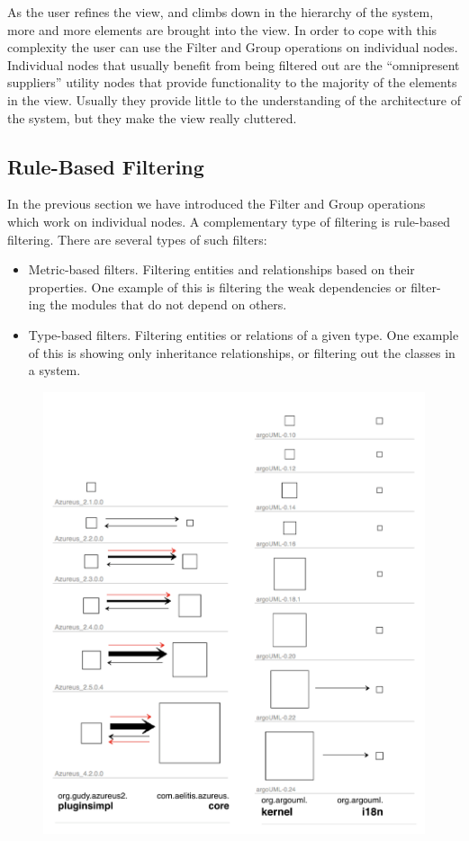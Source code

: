 \documentclass[preprint,12pt]{elsarticle}
\begin{document}
As the user refines the view, and climbs down in the hierarchy of the system, more and more elements are brought into the view. In order to cope with this complexity the user can use the Filter and Group operations on individual nodes. Individual nodes that usually benefit from being filtered out are the “omnipresent suppliers” utility nodes that provide functionality to the majority of the elements in the view. Usually they provide little to the understanding of the architecture of the system, but they make the view really cluttered. 



\subsection {Rule-Based Filtering}

In the previous section we have introduced the Filter and Group operations which work on individual nodes. A complementary type of filtering is rule-based filtering. There are several types of such filters:

\begin{itemize}
\item Metric-based filters. Filtering entities and relationships based on their properties. One example of this is filtering the weak dependencies or filter- ing the modules that do not depend on others.
\item Type-based filters. Filtering entities or relations of a given type. One example of this is showing only inheritance relationships, or filtering out the classes in a system.
\end{itemize}

\begin{figure}[ht!]
\begin{center}
\includegraphics[width=0.7\linewidth]{images/Filmstrip}
\caption{}
\label{}
\end{center}
\end{figure}
\end{document}
